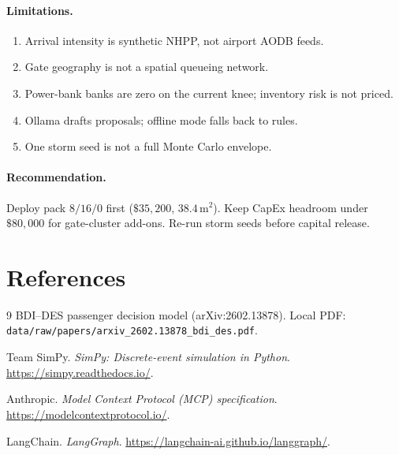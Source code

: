 \documentclass[11pt]{article}
\begin{document}
\paragraph{Limitations.}
\begin{enumerate}[leftmargin=1.4em,itemsep=0.2em]
  \item Arrival intensity is synthetic NHPP, not airport AODB feeds.
  \item Gate geography is not a spatial queueing network.
  \item Power-bank banks are zero on the current knee; inventory risk
        is not priced.
  \item Ollama drafts proposals; offline mode falls back to rules.
  \item One storm seed is not a full Monte Carlo envelope.
\end{enumerate}

\paragraph{Recommendation.}
Deploy pack $8/16/0$ first ($\$35{,}200$, $38.4\,\mathrm{m}^2$).
Keep CapEx headroom under $\$80{,}000$ for gate-cluster add-ons.
Re-run storm seeds before capital release.

\section*{References}
\begin{thebibliography}{9}
BDI--DES passenger decision model (arXiv:2602.13878).
Local PDF: \texttt{data/raw/papers/arxiv\_2602.13878\_bdi\_des.pdf}.

Team SimPy.
\textit{SimPy: Discrete-event simulation in Python}.
\url{https://simpy.readthedocs.io/}.

Anthropic.
\textit{Model Context Protocol (MCP) specification}.
\url{https://modelcontextprotocol.io/}.

LangChain.
\textit{LangGraph}.
\url{https://langchain-ai.github.io/langgraph/}.
\end{thebibliography}
\end{document}
